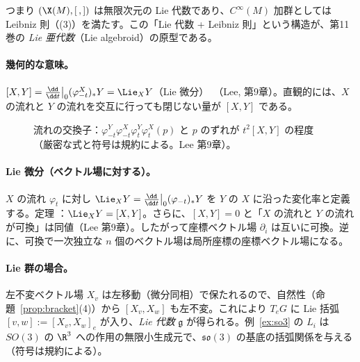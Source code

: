 つまり $(\X(M),[\,,])$ は無限次元の Lie 代数であり、$C^\infty(M)$ 加群としては Leibniz 則（(3)）を満たす。この「Lie 代数 + Leibniz 則」という構造が、第11巻の \emph{Lie 亜代数}（Lie algebroid）の原型である。

\paragraph{幾何的な意味。}$[X,Y]=\frac{\dd}{\dd t}\big|_{0}(\varphi^X_{-t})_*Y=\Lie_XY$（Lie 微分）\tC\ （Lee, 第9章）。直観的には、$X$ の流れと $Y$ の流れを交互に行っても閉じない量が $[X,Y]$ である。

\begin{figure}[h]
\centering
{}
\caption{流れの交換子：$\varphi^Y_{-t}\varphi^X_{-t}\varphi^Y_t\varphi^X_t(p)$ と $p$ のずれが $t^2[X,Y]$ の程度（厳密な式と符号は規約による。Lee 第9章）。}
\end{figure}


\paragraph{Lie 微分（ベクトル場に対する）。}$X$ の流れ $\varphi_t$ に対し $\Lie_XY=\frac{\dd}{\dd t}\big|_{0}(\varphi_{-t})_*Y$ を $Y$ の $X$ に沿った変化率と定義する。定理 \tC：$\Lie_XY=[X,Y]$。さらに、$[X,Y]=0$ と「$X$ の流れと $Y$ の流れが可換」は同値（Lee 第9章）。したがって座標ベクトル場 $\partial_i$ は互いに可換。逆に、可換で一次独立な $n$ 個のベクトル場は局所座標の座標ベクトル場になる。

\paragraph{Lie 群の場合。}左不変ベクトル場 $X_v$ は左移動（微分同相）で保たれるので、自然性（命題~\ref{prop:bracket}(4)）から $[X_v,X_w]$ も左不変。これにより $T_eG$ に Lie 括弧 $[v,w]:=[X_v,X_w]_e$ が入り、\emph{Lie 代数} $\mathfrak g$ が得られる。例~\ref{ex:so3} の $L_i$ は $SO(3)$ の $\R^3$ への作用の無限小生成元で、$\mathfrak{so}(3)$ の基底の括弧関係を与える（符号は規約による）。

